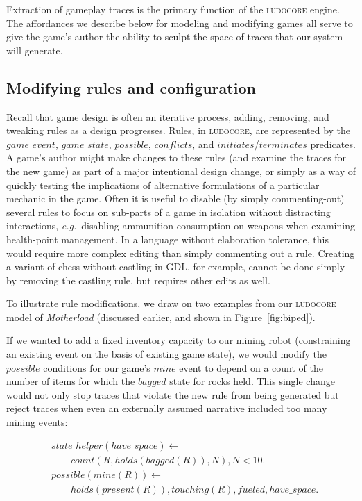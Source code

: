 \documentclass[conference]{IEEEtran}
\newcommand{\ludocore}{\textsc{ludocore}}
\newcommand{\snippet}[1]{{\vspace{-0.4cm}\begin{align*}#1\end{align*}\vspace{-0.4cm}}}
\newcommand{\logical}[1]{$#1$}
\begin{document}
Extraction of gameplay traces is the primary function of the \ludocore{}
engine. The affordances we describe below for modeling and modifying games all
serve to give the game's author the ability to sculpt the space of traces that
our system will generate.

\subsection{Modifying rules and configuration}

Recall that game design is often an iterative process, adding, removing, and
tweaking rules as a design progresses. Rules, in \ludocore, are represented by
the \logical{game\_event}, \logical{game\_state}, \logical{possible},
\logical{conflicts}, and \logical{initiates}/\logical{terminates} predicates. A
game's author might make changes to these rules (and examine the traces for the
new game) as part of a major intentional design change, or simply as a way of
quickly testing the implications of alternative formulations of a particular
mechanic in the game. Often it is useful to disable (by simply commenting-out)
several rules to focus on sub-parts of a game in isolation without distracting
interactions, \emph{e.g.}\ disabling ammunition consumption on weapons when
examining health-point management. In a language without elaboration tolerance,
this would require more complex editing than simply commenting out a rule. Creating
a variant of chess without castling in GDL, for example, cannot be done simply
by removing the castling rule, but requires other edits as well.

To illustrate rule modifications, we draw on two examples from our \ludocore{}
model of \emph{Motherload} (discussed earlier, and shown in
Figure~\ref{fig:biped}).

If we wanted to add a fixed inventory capacity to our mining robot
(constraining an existing event on the basis of existing game state), we would
modify the \logical{possible} conditions for our game's \logical{mine} event to
depend on a count of the number of items for which the \logical{bagged} state
for rocks held. This single change would not only stop traces that violate the
new rule from being generated but reject traces when even an externally assumed
narrative included too many mining events:

\snippet{&state\_helper(have\_space) \leftarrow\\&\qquad count(R,holds(bagged(R)),N), N<10.\\
&possible(mine(R)) \leftarrow\\&\qquad holds(present(R)), touching(R), fueled, have\_space.}
\end{document}
